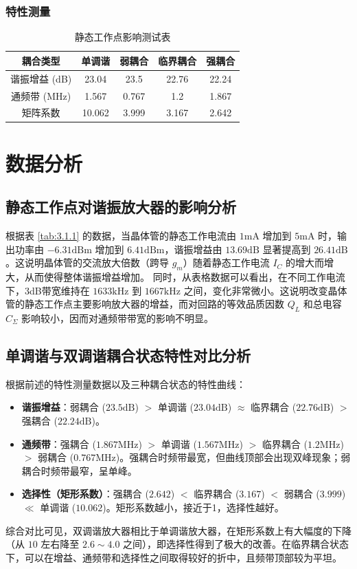 \documentclass[12pt]{article}
\begin{document}
\subsubsection{特性测量}
\begin{table}[h]
	\centering
	\caption{静态工作点影响测试表}
	\begin{tabular}[h]{|c|c|c|c|c|}
		\hline
		耦合类型      & 单调谐 & 弱耦合 & 临界耦合 & 强耦合 \\
		\hline
		谐振增益 (dB) & 23.04  & 23.5   & 22.76    & 22.24  \\
		\hline
		通频带 (MHz)  & 1.567  & 0.767  & 1.2      & 1.867  \\
		\hline
		矩阵系数      & 10.062 & 3.999  & 3.167    & 2.642  \\
		\hline
	\end{tabular}
\end{table}

\section{数据分析}
\subsection{静态工作点对谐振放大器的影响分析}
根据表 \ref{tab:3.1.1} 的数据，当晶体管的静态工作电流由 $1\mathrm{mA}$ 增加到 $5\mathrm{mA}$ 时，输出功率由 $-6.31\mathrm{dBm}$ 增加到 $6.41\mathrm{dBm}$，谐振增益由 $13.69\mathrm{dB}$ 显著提高到 $26.41\mathrm{dB}$。这说明晶体管的交流放大倍数（跨导 $g_m$）随着静态工作电流 $I_C$ 的增大而增大，从而使得整体谐振增益增加。
同时，从表格数据可以看出，在不同工作电流下，3dB带宽维持在 $1633\mathrm{kHz}$ 到 $1667\mathrm{kHz}$ 之间，变化非常微小。这说明改变晶体管的静态工作点主要影响放大器的增益，而对回路的等效品质因数 $Q_L$ 和总电容 $C_{\Sigma}$ 影响较小，因而对通频带带宽的影响不明显。

\subsection{单调谐与双调谐耦合状态特性对比分析}
根据前述的特性测量数据以及三种耦合状态的特性曲线：
\begin{itemize}
	\item \textbf{谐振增益}：弱耦合 ($23.5\mathrm{dB}$) $>$ 单调谐 ($23.04\mathrm{dB}$) $\approx$ 临界耦合 ($22.76\mathrm{dB}$) $>$ 强耦合 ($22.24\mathrm{dB}$)。
	\item \textbf{通频带}：强耦合 ($1.867\mathrm{MHz}$) $>$ 单调谐 ($1.567\mathrm{MHz}$) $>$ 临界耦合 ($1.2\mathrm{MHz}$) $>$ 弱耦合 ($0.767\mathrm{MHz}$)。强耦合时频带最宽，但曲线顶部会出现双峰现象；弱耦合时频带最窄，呈单峰。
	\item \textbf{选择性（矩形系数）}：强耦合 ($2.642$) $<$ 临界耦合 ($3.167$) $<$ 弱耦合 ($3.999$) $\ll$ 单调谐 ($10.062$)。矩形系数越小，接近于1，选择性越好。
\end{itemize}
综合对比可见，双调谐放大器相比于单调谐放大器，在矩形系数上有大幅度的下降（从 $10$ 左右降至 $2.6 \sim 4.0$ 之间），即选择性得到了极大的改善。在临界耦合状态下，可以在增益、通频带和选择性之间取得较好的折中，且频带顶部较为平坦。
\end{document}
